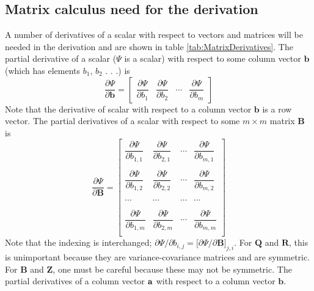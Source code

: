 \documentclass[]{article}
\def\ZZ{\mbox{$\mathbf Z$}}	\def\zz{\mbox{$\mathbf z$}}
\def\BB{\mbox{$\mathbf B$}}	\def\bb{\mbox{$\mathbf b$}}
\def\QQ{\mbox{$\mathbf Q$}}	 \def\qq{\mbox{$\mathbf q$}}
\def\RR{\mbox{$\mathbf R$}}	 \def\rr{\mbox{$\mathbf r$}}
\begin{document}
\subsection{Matrix calculus need for the derivation}\label{sec:MatrixDerivatives}
A number of derivatives of a scalar with respect to vectors and matrices will be needed in the derivation and are shown in table \ref{tab:MatrixDerivatives}. The partial derivative of a scalar ($\Psi$ is a scalar) with respect to some column vector $\bb$ (which has elements $b_1$, $b_2$ . . .) is 
\begin{equation*}
\frac{\partial\Psi}{\partial\bb}=
\begin{bmatrix}
\dfrac{\partial\Psi}{\partial b_1}& \dfrac{\partial\Psi}{\partial b_2}& \cdots& \dfrac{\partial\Psi}{\partial b_m}
\end{bmatrix}
\end{equation*}
 Note that the derivative of scalar with respect to a column vector $\bb$ is a row vector. The partial derivatives of a scalar with respect to some $m \times m$ matrix $\BB$ is
\begin{equation*}
\frac{\partial\Psi}{\partial\BB}=
\begin{bmatrix}
\dfrac{\partial\Psi}{\partial b_{1,1}}& \dfrac{\partial\Psi}{\partial b_{2,1}}& \cdots& \dfrac{\partial\Psi}{\partial b_{m,1}}\\
\\
\dfrac{\partial\Psi}{\partial b_{1,2}}& \dfrac{\partial\Psi}{\partial b_{2,2}}& \cdots& \dfrac{\partial\Psi}{\partial b_{m,2}}\\
\\
\cdots&  \cdots&  \cdots&  \cdots\\
\\
\dfrac{\partial\Psi}{\partial b_{1,m}}& \dfrac{\partial\Psi}{\partial b_{2,m}}& \cdots& \dfrac{\partial\Psi}{\partial b_{m,m}}\\
\end{bmatrix}
\end{equation*} 
Note that the indexing is interchanged; $\partial\Psi/\partial b_{i,j}=\big[\partial\Psi/\partial\BB\big]_{j,i}$. For $\QQ$ and $\RR$, this is unimportant because they are variance-covariance matrices and are symmetric. For $\BB$ and $\ZZ$, one must be careful because these may not be symmetric. The partial derivatives of a column vector $\aa$ with respect to a column vector $\bb$.
\end{document}

